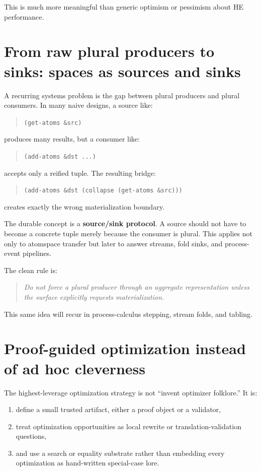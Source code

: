 \documentclass[11pt]{article}
\begin{document}
This is much more meaningful than generic optimism or pessimism about HE performance.

\section{From raw plural producers to sinks: spaces as sources and sinks}
A recurring systems problem is the gap between plural producers and plural consumers. In many naive designs, a source like:
\begin{quote}
\texttt{(get-atoms \&src)}
\end{quote}
produces many results, but a consumer like:
\begin{quote}
\texttt{(add-atoms \&dst ...)}
\end{quote}
accepts only a reified tuple. The resulting bridge:
\begin{quote}
\texttt{(add-atoms \&dst (collapse (get-atoms \&src)))}
\end{quote}
creates exactly the wrong materialization boundary.

The durable concept is a \textbf{source/sink protocol}. A source should not have to become a concrete tuple merely because the consumer is plural. This applies not only to atomspace transfer but later to answer streams, fold sinks, and process-event pipelines.

The clean rule is:
\begin{quote}
\emph{Do not force a plural producer through an aggregate representation unless the surface explicitly requests materialization.}
\end{quote}

This same idea will recur in process-calculus stepping, stream folds, and tabling.

\section{Proof-guided optimization instead of ad hoc cleverness}
The highest-leverage optimization strategy is not ``invent optimizer folklore.'' It is:
\begin{enumerate}
  \item define a small trusted artifact, either a proof object or a validator,
  \item treat optimization opportunities as local rewrite or translation-validation questions,
  \item and use a search or equality substrate rather than embedding every optimization as hand-written special-case lore.
\end{enumerate}
\end{document}
